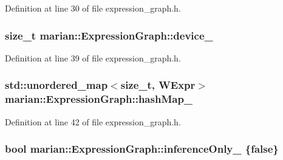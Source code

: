 Definition at line 30 of file expression\+\_\+graph.\+h.

\subsubsection[{\texorpdfstring{device\+\_\+}{device_}}]{\setlength{\rightskip}{0pt plus 5cm}size\+\_\+t marian\+::\+Expression\+Graph\+::device\+\_\+\hspace{0.3cm}{\ttfamily [private]}}\hypertarget{classmarian_1_1ExpressionGraph_a25101cf64e67c3479ff3fff20a84b3a3}{}\label{classmarian_1_1ExpressionGraph_a25101cf64e67c3479ff3fff20a84b3a3}


Definition at line 39 of file expression\+\_\+graph.\+h.

\subsubsection[{\texorpdfstring{hash\+Map\+\_\+}{hashMap_}}]{\setlength{\rightskip}{0pt plus 5cm}std\+::unordered\+\_\+map$<$size\+\_\+t, {\bf W\+Expr}$>$ marian\+::\+Expression\+Graph\+::hash\+Map\+\_\+\hspace{0.3cm}{\ttfamily [private]}}\hypertarget{classmarian_1_1ExpressionGraph_aca7c6d3f9253ab38d18d917b8cbd6fd4}{}\label{classmarian_1_1ExpressionGraph_aca7c6d3f9253ab38d18d917b8cbd6fd4}


Definition at line 42 of file expression\+\_\+graph.\+h.

\subsubsection[{\texorpdfstring{inference\+Only\+\_\+}{inferenceOnly_}}]{\setlength{\rightskip}{0pt plus 5cm}bool marian\+::\+Expression\+Graph\+::inference\+Only\+\_\+ \{false\}\hspace{0.3cm}{\ttfamily [private]}}\hypertarget{classmarian_1_1ExpressionGraph_aa2c948ce5f377474df5f3a30db424541}{}\label{classmarian_1_1ExpressionGraph_aa2c948ce5f377474df5f3a30db424541}



